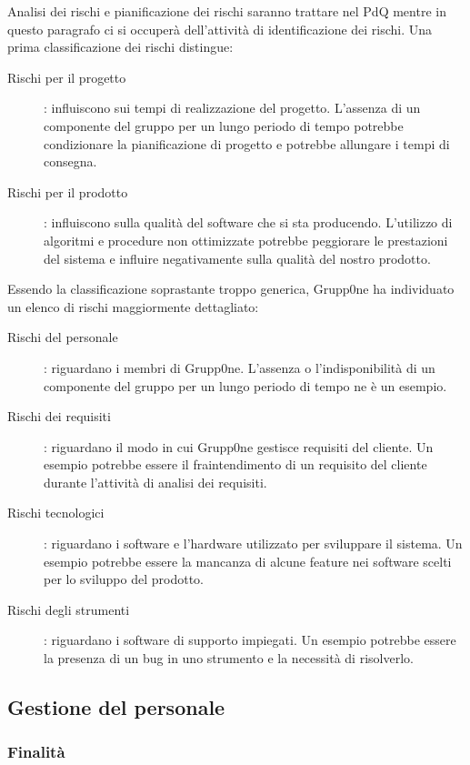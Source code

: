 \documentclass[../norme-di-progetto.tex]{subfiles}
\begin{document}
Analisi dei rischi e pianificazione dei rischi saranno trattare nel PdQ mentre in questo paragrafo ci si occuperà dell'attività di identificazione dei rischi.
Una prima classificazione dei rischi distingue:

\begin{description}
  \item [Rischi per il progetto]: influiscono sui tempi di realizzazione del progetto. L'assenza di un componente del gruppo per un lungo periodo di tempo potrebbe condizionare la pianificazione di progetto e potrebbe allungare i tempi di consegna.
  \item [Rischi per il prodotto]: influiscono sulla qualità del software che si sta producendo. L'utilizzo di algoritmi e procedure non ottimizzate potrebbe peggiorare le prestazioni del sistema e influire negativamente sulla qualità del nostro prodotto.
\end{description}
Essendo la classificazione soprastante troppo generica, Grupp0ne ha individuato un elenco di rischi maggiormente dettagliato:
\begin{description}
  \item [Rischi del personale]: riguardano i membri di Grupp0ne. L'assenza o l'indisponibilità di un componente del gruppo per un lungo periodo di tempo ne è un esempio.
  \item [Rischi dei requisiti]: riguardano il modo in cui Grupp0ne gestisce requisiti del cliente. Un esempio potrebbe essere il fraintendimento di un requisito del cliente durante l'attività di analisi dei requisiti.
  \item [Rischi tecnologici]: riguardano i software e l'hardware utilizzato per sviluppare il sistema. Un esempio potrebbe essere la mancanza di alcune feature nei software scelti per lo sviluppo del prodotto.
  \item [Rischi degli strumenti]: riguardano i software di supporto impiegati. Un esempio potrebbe essere la presenza di un bug in uno strumento e la necessità di risolverlo.
\end{description}

\subsection{Gestione del personale}%
\label{sub:gestione del personale}

\subsubsection{Finalità}%
\label{subs:Gestione del personale/finalita}
\end{document}
